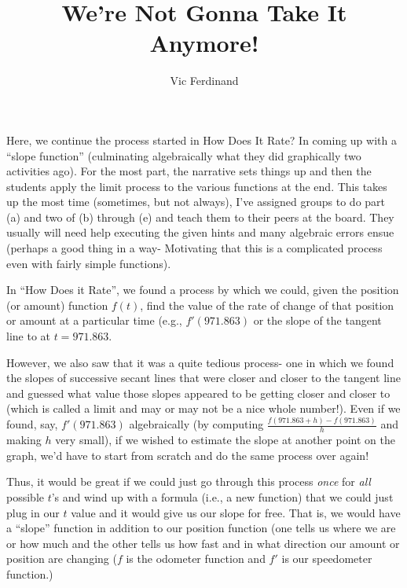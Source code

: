 \documentclass{ximera}
\author{Vic Ferdinand}
\title{We're Not Gonna Take It Anymore!}
\begin{document}
\begin{abstract} 
\end{abstract}
\maketitle

\begin{instructorIntro}
Here, we continue the process started in How Does It Rate?  In coming up with a ``slope function'' (culminating algebraically what they did graphically two activities ago).  For the most part, the narrative sets things up and then the students apply the limit process to the various functions at the end.  This takes up the most time (sometimes, but not always), I've assigned groups to do part (a) and two of (b) through (e) and teach them to their peers at the board.  They usually will need help executing the given hints and many algebraic errors ensue (perhaps a good thing in a way- Motivating that this is a complicated process even with fairly simple functions).
\end{instructorIntro}



In ``How Does it Rate'', we found a process by which we could, given the position (or amount) function  $f(t)$, find the value of the rate of change of that position or amount at a particular time (e.g., $f'(971.863)$  or the slope of the tangent line to at $t=971.863$.

However, we also saw that it was a quite tedious process- one in which we found the slopes of successive secant lines that were closer and closer to the tangent line and guessed what value those slopes appeared to be getting closer and closer to (which is called a limit and may or may not be a nice whole number!).  Even if we found, say, $f'(971.863)$ algebraically (by computing $\frac{f(971.863+h) - f(971.863)}{h}$  and making $h$ very small), if we wished to estimate the slope at another point on the graph, we'd have to start from scratch and do the same process over again!

Thus, it would be great if we could just go through this process {\em once} for {\em all} possible $t$'s and wind up with a formula (i.e., a new function) that we could just plug in our $t$ value and it would give us our slope for free.  That is, we would have a ``slope'' function in addition to our position function (one tells us where we are or how much and the other tells us how fast and in what direction our amount or position are changing ($f$ is the odometer function and $f'$ is our speedometer function.)
\end{document}
